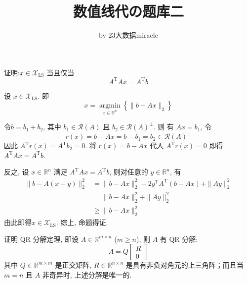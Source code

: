 \documentclass[12pt, answers]{exam}     %
\title{数值线代の题库二}
\author{by 23大数据miracle}
\date{}
\newcommand{\XLS}{\mathcal{X}_{\mathrm{LS}}}
\newcommand{\R}{\mathbb{R}}
\newcommand{\range}{\mathcal{R}}
\newcommand{\argmin}{\operatorname*{argmin}}
\newcommand{\T}{\mathrm{T}}
\begin{document}
\maketitle

\begin{questions}

\question{}
证明:\( x \in \XLS \) 当且仅当
\[
A^{\T} A x = A^{\T} b
\]

\begin{solution}
设 \( x \in \XLS \).  即
\[
x = \argmin_{x \in \R^n}  \left\{ \|b - Ax\|_2 \right\}
\]

令\( b = b_1 + b_2 \), 其中 \( b_1 \in \range(A) \) 且 \( b_2 \in \range(A)^{\perp} \).  则
有 \( Ax = b_1 \), 令
\[
r(x) = b - Ax = b - b_1 = b_2 \in \range(A)^{\perp}
\]
因此 \( A^{\T} r(x) = A^{\T} b_2 = 0 \).  将 \( r(x) = b - Ax \) 代入 \( A^{\T} r(x) = 0 \) 即得\( A^{\T} A x = A^{\T} b \). 

反之, 设 \( x \in \R^n \) 满足 \( A^{\T} A x = A^{\T} b \), 则对任意的 \( y \in \R^n \), 有
\begin{align*}
\|b - A(x + y)\|_2^2 &= \|b - Ax\|_2^2 - 2y^{\T} A^{\T} (b - Ax) + \|Ay\|_2^2 \\
&= \|b - Ax\|_2^2 + \|Ay\|_2^2 \\
&\geq \|b - Ax\|_2^2
\end{align*}
由此即得\( x \in \XLS \). 综上, 命题得证. 

\end{solution}


\question{}
证明 QR 分解定理, 即设 \( A \in \R^{m \times n} \) (\( m \geq n \)), 则 \( A \) 有 QR 分解:
\[
A = Q 
\begin{bmatrix}
R \\
0
\end{bmatrix}
\]
其中 \( Q \in \R^{m \times m} \) 是正交矩阵, \( R \in \R^{n \times n} \) 是具有非负对角元的上三角阵；而且当 \( m = n \) 且 \( A \) 非奇异时, 上述分解是唯一的. 


\end{questions}
\end{document}
